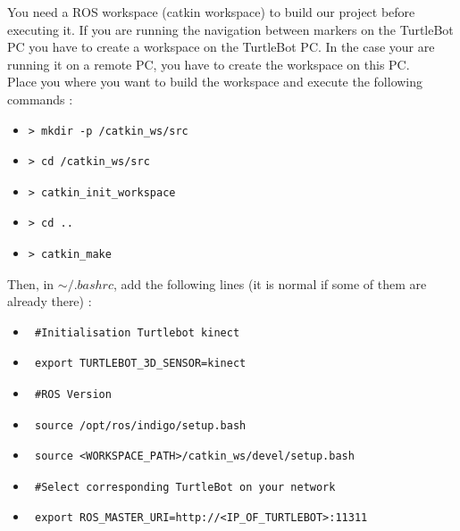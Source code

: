 \documentclass[10pt,a4paper]{article}
\begin{document}
You need a ROS workspace (catkin workspace) to build our project before executing it. If you are running the navigation between markers on the TurtleBot PC you have to create a workspace on the TurtleBot PC. In the case your are running it on a remote PC, you have to create the workspace on this PC.\\

Place you where you want to build the workspace and execute the following commands :

\begin{itemize}
\item[]  \begin{verbatim}> mkdir -p /catkin_ws/src \end{verbatim}
\item[]  \begin{verbatim}> cd /catkin_ws/src \end{verbatim}
\item[]  \begin{verbatim}> catkin_init_workspace \end{verbatim}
\item[]  \begin{verbatim}> cd .. \end{verbatim}
\item[]  \begin{verbatim}> catkin_make \end{verbatim}
\end{itemize}

Then, in $\sim/.bashrc$, add the following lines (it is normal if some of them are already there) :

\begin{itemize}
\item[]  \begin{verbatim} #Initialisation Turtlebot kinect \end{verbatim}
\item[]  \begin{verbatim} export TURTLEBOT_3D_SENSOR=kinect \end{verbatim}
\item[]  \begin{verbatim} #ROS Version \end{verbatim}
\item[]  \begin{verbatim} source /opt/ros/indigo/setup.bash \end{verbatim}
\item[]  \begin{verbatim} source <WORKSPACE_PATH>/catkin_ws/devel/setup.bash \end{verbatim}
\item[]  \begin{verbatim} #Select corresponding TurtleBot on your network \end{verbatim}
\item[]  \begin{verbatim} export ROS_MASTER_URI=http://<IP_OF_TURTLEBOT>:11311  \end{verbatim}
\end{itemize}
\end{document}
